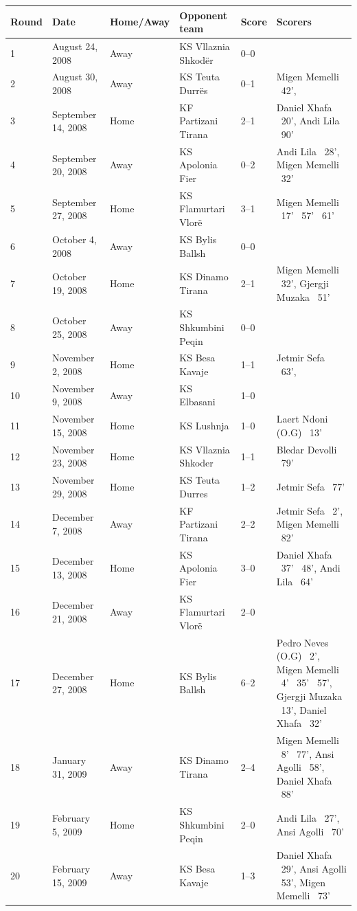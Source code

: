 \documentclass{article}
\begin{document}
\begin{tabular}{llllll}
\toprule
Round & Date & Home/Away & Opponent team & Score & Scorers \\
\midrule
1 & August 24, 2008 & Away & KS Vllaznia Shkodër & 0–0 &  \\
2 & August 30, 2008 & Away & KS Teuta Durrës & 0–1 & Migen Memelli  42', \\
3 & September 14, 2008 & Home & KF Partizani Tirana & 2–1 & Daniel Xhafa  20', Andi Lila  90' \\
4 & September 20, 2008 & Away & KS Apolonia Fier & 0–2 & Andi Lila  28', Migen Memelli  32' \\
5 & September 27, 2008 & Home & KS Flamurtari Vlorë & 3–1 & Migen Memelli  17'  57'  61' \\
6 & October 4, 2008 & Away & KS Bylis Ballsh & 0–0 &  \\
7 & October 19, 2008 & Home & KS Dinamo Tirana & 2–1 & Migen Memelli  32', Gjergji Muzaka  51' \\
8 & October 25, 2008 & Away & KS Shkumbini Peqin & 0–0 &  \\
9 & November 2, 2008 & Home & KS Besa Kavaje & 1–1 & Jetmir Sefa  63', \\
10 & November 9, 2008 & Away & KS Elbasani & 1–0 &  \\
11 & November 15, 2008 & Home & KS Lushnja & 1–0 & Laert Ndoni (O.G)  13' \\
12 & November 23, 2008 & Home & KS Vllaznia Shkoder & 1–1 & Bledar Devolli  79' \\
13 & November 29, 2008 & Home & KS Teuta Durres & 1–2 & Jetmir Sefa  77' \\
14 & December 7, 2008 & Away & KF Partizani Tirana & 2–2 & Jetmir Sefa  2', Migen Memelli  82' \\
15 & December 13, 2008 & Home & KS Apolonia Fier & 3–0 & Daniel Xhafa  37'  48', Andi Lila  64' \\
16 & December 21, 2008 & Away & KS Flamurtari Vlorë & 2–0 &  \\
17 & December 27, 2008 & Home & KS Bylis Ballsh & 6–2 & Pedro Neves (O.G)  2', Migen Memelli  4'  35'  57', Gjergji Muzaka  13', Daniel Xhafa  32' \\
18 & January 31, 2009 & Away & KS Dinamo Tirana & 2–4 & Migen Memelli  8'  77', Ansi Agolli  58', Daniel Xhafa  88' \\
19 & February 5, 2009 & Home & KS Shkumbini Peqin & 2–0 & Andi Lila  27', Ansi Agolli  70' \\
20 & February 15, 2009 & Away & KS Besa Kavaje & 1–3 & Daniel Xhafa  29', Ansi Agolli  53', Migen Memelli  73' \\

\end{tabular}
\end{document}
